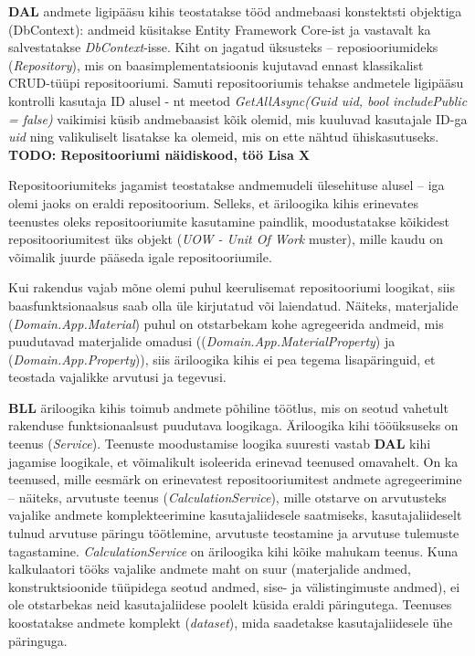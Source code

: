 \textbf{DAL} andmete ligipääsu kihis teostatakse tööd andmebaasi konstektsti objektiga (DbContext):  andmeid küsitakse Entity Framework Core-ist ja 
vastavalt ka salvestatakse \textit{DbContext}-isse. Kiht on jagatud üksusteks -- reposiooriumideks (\textit{Repository}), mis on 
baasimplementatsioonis kujutavad ennast klassikalist CRUD-tüüpi repositooriumi. Samuti repositooriumis 
tehakse  andmetele ligipääsu kontrolli kasutaja ID alusel -
nt meetod \textit{GetAllAsync(Guid uid, bool includePublic = false)} vaikimisi küsib andmebaasist kõik olemid, 
mis kuuluvad kasutajale ID-ga \textit{uid} ning valikuliselt lisatakse ka olemeid, mis on ette nähtud ühiskasutuseks. 
\textbf{TODO: Repositooriumi näidiskood, töö Lisa X}

Repositooriumiteks jagamist teostatakse andmemudeli ülesehituse alusel -- iga olemi jaoks on eraldi repositoorium. Selleks, et
äriloogika kihis erinevates teenustes oleks repositooriumite kasutamine paindlik, moodustatakse kõikidest repositooriumitest üks
objekt (\textit{UOW - Unit Of Work} muster), mille kaudu on võimalik juurde pääseda igale repositooriumile.

Kui rakendus vajab mõne olemi puhul keerulisemat repositooriumi loogikat, siis baasfunktsionaalsus saab olla üle kirjutatud
või laiendatud. Näiteks, materjalide (\textit{Domain.App.Material}) puhul on otstarbekam kohe agregeerida andmeid, 
mis puudutavad materjalide omadusi ((\textit{Domain.App.MaterialProperty}) ja (\textit{Domain.App.Property})), siis
äriloogika kihis ei pea tegema lisapäringuid, et teostada vajalikke arvutusi ja tegevusi.


\textbf{BLL} äriloogika kihis toimub andmete põhiline töötlus, mis on seotud vahetult rakenduse funktsionaalsust puudutava loogikaga.
Äriloogika kihi tööüksuseks on teenus (\textit{Service}). Teenuste moodustamise loogika suuresti vastab \textbf{DAL} kihi jagamise loogikale,
et võimalikult isoleerida erinevad teenused omavahelt. On ka teenused, mille eesmärk on erinevatest repositooriumitest andmete agregeerimine --
näiteks, arvutuste teenus (\textit{CalculationService}), mille otstarve on arvutusteks vajalike andmete komplekteerimine kasutajaliidesele
saatmiseks, kasutajaliideselt tulnud arvutuse päringu töötlemine, arvutuste teostamine ja arvutuse tulemuste tagastamine.
\textit{CalculationService} on äriloogika kihi kõike mahukam teenus. Kuna kalkulaatori tööks vajalike andmete maht on suur (materjalide
andmed, konstruktsioonide tüüpidega seotud andmed, sise- ja välistingimuste andmed), ei ole otstarbekas
neid kasutajaliidese poolelt küsida eraldi päringutega. Teenuses koostatakse andmete komplekt (\textit{dataset}), mida saadetakse
kasutajaliidesele ühe päringuga.

